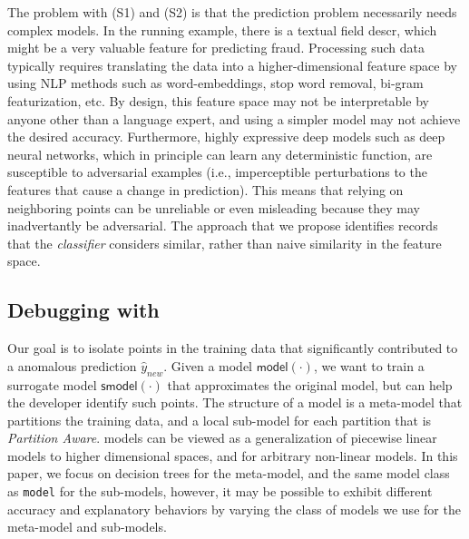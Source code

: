 The problem with (S1) and (S2) is that the prediction problem necessarily needs complex models. In the running example, there is a textual field \textsf{descr}, which might be a very valuable feature for predicting fraud. Processing such data typically requires translating the data into a higher-dimensional feature space by using NLP methods such as word-embeddings, stop word removal, bi-gram featurization, etc.  By design, this feature space may not be interpretable by anyone other than a language expert, and using a simpler model may not achieve the desired accuracy. Furthermore, highly expressive deep models such as deep neural networks, which in principle can learn any deterministic function, are susceptible to adversarial examples (i.e., imperceptible perturbations to the features that cause a change in prediction)\cite{szegedy2013intriguing}. This means that relying on neighboring points can be unreliable or even misleading because they may inadvertantly be adversarial.  The approach that we propose identifies records that the {\it classifier} considers similar, rather than naive similarity in the feature space.

\subsection{Debugging with \sys}
Our goal is to isolate points in the training data that significantly contributed to a anomalous prediction $\hat{y}_{new}$.
Given a model $\textsf{model}(\cdot)$, we want to train a surrogate \sys model $\textsf{smodel}(\cdot)$ that approximates the original model, but can help the developer identify such points.
The structure of a \sys model is a meta-model that partitions the training data, and a local sub-model for each partition that is {\it Partition Aware}.
\sys models can be viewed as a generalization of piecewise linear models to higher dimensional spaces, and for arbitrary non-linear models.     
In this paper, we focus on decision trees for the meta-model, and the same model class as \texttt{model} for the sub-models, however, it may be possible to exhibit different accuracy and explanatory behaviors by varying the class of models we use for the meta-model and sub-models.

